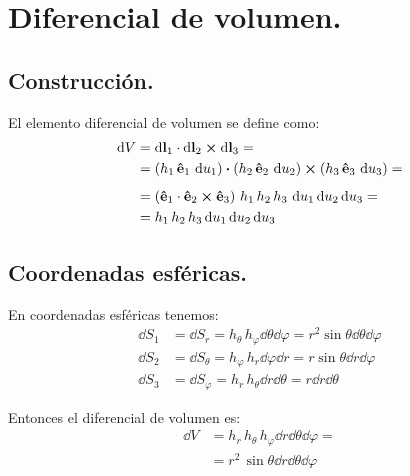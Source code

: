 \documentclass[12pt]{article}
\numberwithin{equation}{section}
\begin{document}
\section{Diferencial de volumen.}

\subsection{Construcción.}

El elemento diferencial de volumen se define como:
\begin{align*}
\dd{V} &= \dd{\vb{l}_{1}} \cdot \dd{\vb{l}_{2}} \cp \dd{\vb{l}_{3}} = \\
&= \left( h_{1} \, \vu{e}_{1} \, \dd{u}_{1} \right) \vdot \left( h_{2} \, \vu{e}_{2} \, \dd{u}_{2} \right) \cp \left( h_{3} \, \vu{e}_{3} \, \dd{u}_{3} \right) =  \\[0.5em]
&= \left( \vu{e}_{1} \cdot \vu{e}_{2} \cp \vu{e}_{3} \right) \, h_{1} \, h_{2} \, h_{3} \, \dd{u_{1}} \dd{u_{2}} \dd{u_{3}} = \\ 
&= h_{1} \, h_{2} \, h_{3} \dd{u_{1}} \dd{u_{2}} \dd{u_{3}}
\end{align*}

\subsection{Coordenadas esféricas.}

En coordenadas esféricas tenemos:
\begin{align*}
\dd{S_{1}} &= \dd{S_{r}} = h_{\theta} \, h_{\varphi} \dd{\theta} \dd{\varphi} = r^{2} \sin \theta \dd{\theta} \dd{\varphi} \\[0.5em]
\dd{S_{2}} &= \dd{S_{\theta}} = h_{\varphi} \, h_{r} \dd{\varphi} \dd{r} = r \sin \theta \dd{r} \dd{\varphi} \\[0.5em]
\dd{S_{3}} &= \dd{S_{\varphi}} = h_{r} \, h_{\theta} \dd{r} \dd{\theta} = r \dd{r} \dd{\theta}
\end{align*}

Entonces el diferencial de volumen es:
\begin{align*}
\dd{V} &= h_{r} \, h_{\theta} \, h_{\varphi} \dd{r} \dd{\theta} \dd{\varphi} = \\[0.5em]
&= r^{2} \, \sin \theta \dd{r} \dd{\theta} \dd{\varphi}
\end{align*}

\end{document}
